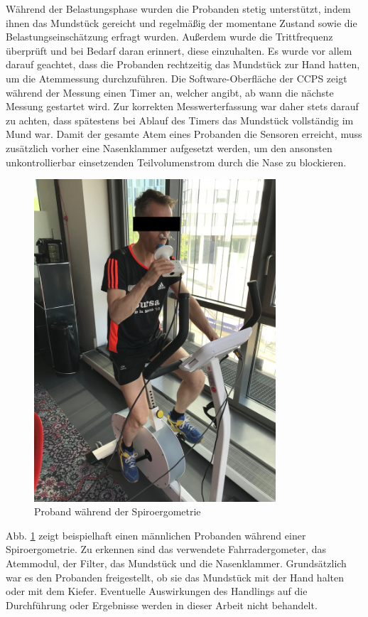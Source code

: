 Während der Belastungsphase wurden die Probanden stetig unterstützt, indem ihnen das Mundstück gereicht und regelmäßig der momentane Zustand sowie die Belastungseinschätzung erfragt wurden. Außerdem wurde die Trittfrequenz überprüft und bei Bedarf daran erinnert, diese einzuhalten. Es wurde vor allem darauf geachtet, dass die Probanden rechtzeitig das Mundstück zur Hand hatten, um die Atemmessung durchzuführen. Die Software-Oberfläche der \acs{CCPS} zeigt während der Messung einen Timer an, welcher angibt, ab wann die nächste Messung gestartet wird. Zur korrekten Messwerterfassung war daher stets darauf zu achten, dass spätestens bei Ablauf des Timers das Mundstück vollständig im Mund war. Damit der gesamte Atem eines Probanden die Sensoren erreicht, muss zusätzlich vorher eine Nasenklammer aufgesetzt werden, um den ansonsten unkontrollierbar einsetzenden Teilvolumenstrom durch die Nase zu blockieren.
%
\begin{figure}[H]
	\centering
	\includegraphics[width=90mm]{Bilder/proband.jpg}
	\caption{Proband während der Spiroergometrie}
	\label{pic:pic11}
\end{figure}
%
Abb. \ref{pic:pic11} zeigt beispielhaft einen männlichen Probanden während einer Spiroergometrie. Zu erkennen sind das verwendete Fahrradergometer, das Atemmodul, der Filter, das Mundstück und die Nasenklammer. Grundsätzlich war es den Probanden freigestellt, ob sie das Mundstück mit der Hand halten oder mit dem Kiefer. Eventuelle Auswirkungen des Handlings auf die Durchführung oder Ergebnisse werden in dieser Arbeit nicht behandelt.\\
